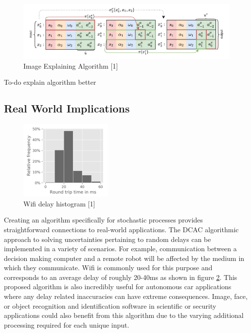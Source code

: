 \documentclass{article} %
\begin{document}
\begin{figure}[H]
\begin{center}
\includegraphics[scale=0.2]{images/fig4FromPaper}
\end{center}
\caption{Image Explaining Algorithm [1]}
\label{imageExplainAlorithm}
\end{figure}

To-do explain algorithm better

\subsection{Real World Implications}

\begin{figure}[H]
\begin{center}
\includegraphics[scale=1]{images/wifilatency.png}
\end{center}
\caption{Wifi delay histogram  [1]}
\label{wifiHistogram}
\end{figure}

Creating an algorithm specifically for stochastic processes provides straightforward connections to real-world applications. The DCAC algorithmic approach to solving uncertainties pertaining to random delays can be implemented in a variety of scenarios. For example, communication between a decision making computer and a remote robot will be affected by the medium in which they communicate. Wifi is commonly used for this purpose and corresponds to an average delay of roughly 20-40ms as shown in figure \ref{wifiHistogram}. This proposed algorithm is also incredibly useful for autonomous car applications where any delay related inaccuracies can have extreme consequences. Image, face, or object recognition and identification software in scientific or security applications could also benefit from this algorithm due to the varying additional processing required for each unique input.
\end{document}
